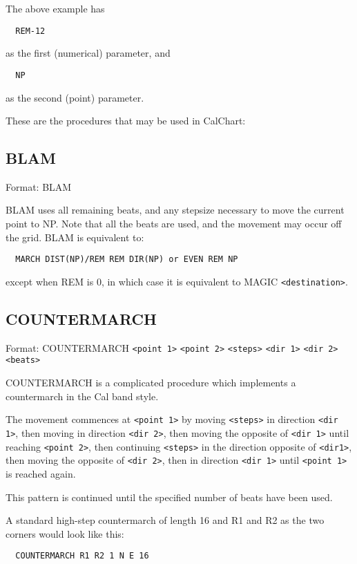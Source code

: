 The above example has
\begin{verbatim}
  REM-12
\end{verbatim}
as the first (numerical) parameter, and
\begin{verbatim}
  NP
\end{verbatim}
as the second (point) parameter.

These are the procedures that may be used in CalChart:

\subsection{BLAM}\label{blam}

Format: BLAM

BLAM uses all remaining beats, and any stepsize necessary to move the current
point to NP.  Note that all the beats are used, and the movement
may occur off the grid.  BLAM is equivalent to:
\begin{verbatim}
  MARCH DIST(NP)/REM REM DIR(NP) or EVEN REM NP
\end{verbatim}
except when REM is 0, in which case it is equivalent to
MAGIC \verb$<destination>$.

\subsection{COUNTERMARCH}\label{countermarch}

Format: COUNTERMARCH \verb$<point 1>$ \verb$<point 2>$ \verb$<steps>$ \verb$<dir 1>$ \verb$<dir 2>$ \verb$<beats>$

COUNTERMARCH is a complicated procedure which implements a countermarch in
the Cal band style.

The movement commences at \verb$<point 1>$ by moving \verb$<steps>$ in
direction \verb$<dir 1>$, then moving in direction \verb$<dir 2>$, then
moving the opposite of \verb$<dir 1>$ until reaching \verb$<point 2>$,
then continuing \verb$<steps>$ in the direction opposite of \verb$<dir1>$,
then moving the opposite of \verb$<dir 2>$, then in direction \verb$<dir 1>$
until \verb$<point 1>$ is reached again.

This pattern is continued until the specified number of beats have been used.

A standard high-step countermarch of length 16 and R1 and R2 as the two
corners would look like this:
\begin{verbatim}
  COUNTERMARCH R1 R2 1 N E 16
\end{verbatim}

